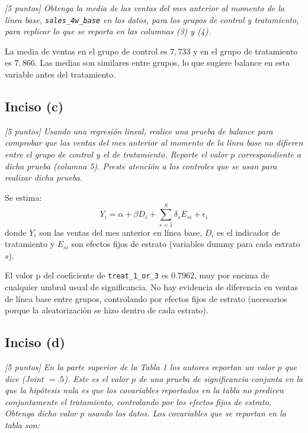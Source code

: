 \documentclass[12pt]{article}
\begin{document}
\textit{[5 puntos] Obtenga la media de las ventas del mes anterior al momento de la línea base, \texttt{sales\_4w\_base} en los datos, para los grupos de control y tratamiento, para replicar lo que se reporta en las columnas (3) y (4).}



La media de ventas en el grupo de control es $7{,}733$ y en el grupo de tratamiento es $7{,}866$. Las medias son similares entre grupos, lo que sugiere balance en esta variable antes del tratamiento.

\subsection*{Inciso (c)}

\textit{[5 puntos] Usando una regresión lineal, realice una prueba de balance para comprobar que las ventas del mes anterior al momento de la línea base no difieren entre el grupo de control y el de tratamiento. Reporte el valor $p$ correspondiente a dicha prueba (columna 5). Preste atención a los controles que se usan para realizar dicha prueba.}

Se estima:
\begin{equation}
Y_i = \alpha + \beta D_i + \sum_{s=1}^{S} \delta_s E_{si} + \epsilon_i
\end{equation}
donde $Y_i$ son las ventas del mes anterior en línea base, $D_i$ es el indicador de tratamiento y $E_{si}$ son efectos fijos de estrato (variables dummy para cada estrato $s$).



El valor p del coeficiente de \texttt{treat\_1\_or\_3} es $0.7962$, muy por encima de cualquier umbral usual de significancia. No hay evidencia de diferencia en ventas de línea base entre grupos, controlando por efectos fijos de estrato (necesarios porque la aleatorización se hizo dentro de cada estrato).

\subsection*{Inciso (d)}

\textit{[5 puntos] En la parte superior de la Tabla 1 los autores reportan un valor $p$ que dice (Joint $= .5$). Este es el valor $p$ de una prueba de significancia conjunta en la que la hipótesis nula es que los covariables reportados en la tabla no predicen conjuntamente el tratamiento, controlando por los efectos fijos de estrato. Obtenga dicho valor $p$ usando los datos. Los covariables que se reportan en la tabla son:}
\end{document}
